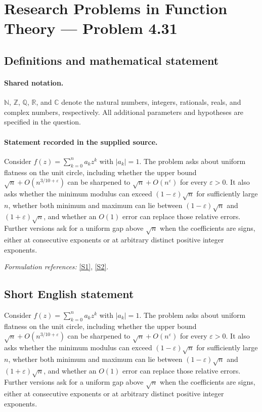 \documentclass[11pt]{article}
\newcommand{\sref}[2]{\hyperlink{source:#1:#2}{[S#2]}}
\begin{document}
\section{Research Problems in Function Theory — Problem 4.31}\label{statement}

\subsection{Definitions and mathematical statement}

\paragraph{Shared notation.}$\mathbb N$, $\mathbb Z$, $\mathbb Q$, $\mathbb R$, and $\mathbb C$ denote the natural numbers, integers, rationals, reals, and complex numbers, respectively. All additional parameters and hypotheses are specified in the question.


\paragraph{Statement recorded in the supplied source.}
Consider $f(z)=\sum_{k=0}^na_kz^k$ with $|a_k|=1$. The problem asks about uniform flatness on the unit circle, including whether the upper bound $\sqrt n+O(n^{3/10+\varepsilon})$ can be sharpened to $\sqrt n+O(n^\varepsilon)$ for every $\varepsilon>0$. It also asks whether the minimum modulus can exceed $(1-\varepsilon)\sqrt n$ for sufficiently large $n$, whether both minimum and maximum can lie between $(1-\varepsilon)\sqrt n$ and $(1+\varepsilon)\sqrt n$, and whether an $O(1)$ error can replace those relative errors. Further versions ask for a uniform gap above $\sqrt n$ when the coefficients are signs, either at consecutive exponents or at arbitrary distinct positive integer exponents.
\par\smallskip\textit{Formulation references:} \sref{statement}{1}, \sref{statement}{2}.
\subsection{Short English statement}
Consider $f(z)=\sum_{k=0}^na_kz^k$ with $|a_k|=1$. The problem asks about uniform flatness on the unit circle, including whether the upper bound $\sqrt n+O(n^{3/10+\varepsilon})$ can be sharpened to $\sqrt n+O(n^\varepsilon)$ for every $\varepsilon>0$. It also asks whether the minimum modulus can exceed $(1-\varepsilon)\sqrt n$ for sufficiently large $n$, whether both minimum and maximum can lie between $(1-\varepsilon)\sqrt n$ and $(1+\varepsilon)\sqrt n$, and whether an $O(1)$ error can replace those relative errors. Further versions ask for a uniform gap above $\sqrt n$ when the coefficients are signs, either at consecutive exponents or at arbitrary distinct positive integer exponents.
\end{document}
